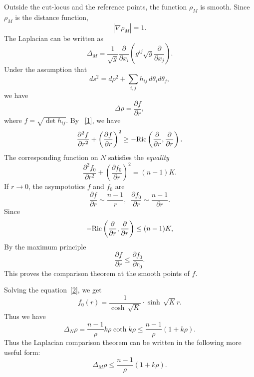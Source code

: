  Outside the cut-locus and the reference points, the function $ \rho_M$ is smooth. Since $ \rho_M $ is the distance function,
%
\[ |\nabla \rho_M|=1.\]
%
The Laplacian can be written as 
\[ \Delta_M = \frac{1}{\sqrt{g}} \frac{\partial }{\partial x_i} \left( g^{ij} \sqrt{g} \frac{\partial }{\partial x_j}\right). \]
%
Under the assumption that 
\[ ds^2 = d\rho^2 +\sum_{i,j} h_{ij}\, d \theta_i d \theta_j, \]
%
we have 
%
\[\Delta \rho = \frac{\partial f}{\partial r},\]
where $f=\sqrt{\det h_{ij}}$.
%
By ~\eqref{1}, we have
\[ \frac{\partial^2 f}{\partial r^2} + \left( \frac{\partial f}{\partial r} \right) ^2 \geq - {\rm Ric} \left( \frac{\partial }{\partial r} , \frac{\partial }{\partial r} \right) .\]
%
The corresponding function on $N$ satisfies the {\it equality}
\begin{equation} \label{2}
\frac{\partial^2 f_0}{\partial r^2} + \left( \frac{\partial f_0}{\partial r} \right) ^2 = ( n-1) K.
\end{equation}
%
If $r\to 0$, the asympototics  $f$ and $f_0$ are 
%
\[ \frac{\partial f}{\partial r}  \sim \frac{n-1}{  r} ,  \;\;  \frac{\partial f_0}{\partial r} \sim  \frac{n-1}{\partial r}.  \]
Since
%
\[ - {\rm Ric} \left(    \frac{\partial }{\partial r} ,  \frac{\partial }{\partial r}  \right) \leq ( n - 1) K,\]
%
By the maximum principle 
%
\[ \frac{\partial f}{\partial r}  \leq \frac{\partial f_0}{\partial r_0}.  \]
%
This proves the comparison theorem at the smooth points of $f$.


Solving the equation~\eqref{2}, we get 
%
\[ f_0(r) = \frac{1}{\cosh \,  \sqrt K} \cdot \sinh \, \sqrt K r .\]
%
Thus we have 
%
\[ \Delta _N \rho = \frac{n-1}{\rho} k \rho \coth k\rho \leq \frac{n-1}{\rho}  (1 + k \rho). \]
Thus the Laplacian comparison theorem can be written in the following more useful form:
%
\[ \Delta _M \rho \leq \frac{n-1}{\rho} ( 1 + k \rho) .\]

